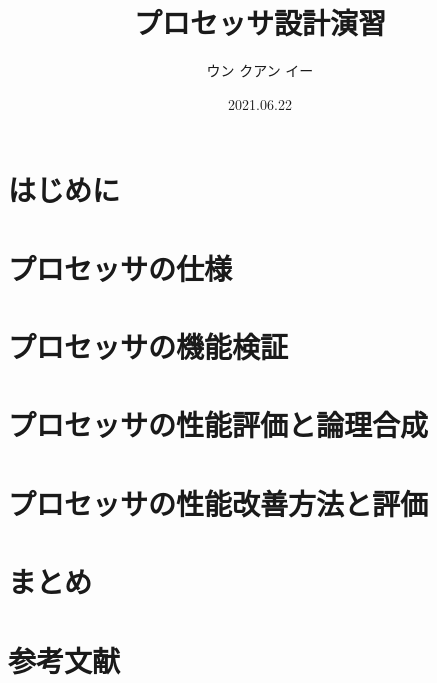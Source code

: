 \documentclass[a4paper, 10pt]{jsarticle}
\title{プロセッサ設計演習}
\author{ウン クアン イー}
\date{2021.06.22}
\begin{document}
  
  \maketitle

  \section{はじめに}
  

  \section{プロセッサの仕様}
  

  \section{プロセッサの機能検証}
  

  \section{プロセッサの性能評価と論理合成}
  

  \section{プロセッサの性能改善方法と評価}
  

  \section{まとめ}
  

  \section*{参考文献}
  
\end{document}
